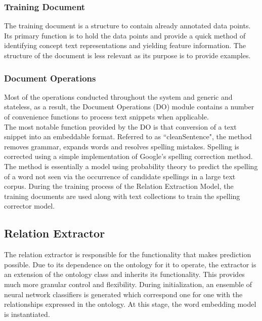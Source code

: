 \documentclass[12pt]{article} %
\begin{document}
\subsubsection{Training Document}

The training document is a structure to contain already annotated data points. Its primary function is to hold the data points and provide a quick method of identifying concept text representations and yielding feature information. The structure of the document is less relevant as its purpose is to provide examples. 

\subsubsection{Document Operations}

Most of the operations conducted throughout the system and generic and stateless, as a result, the Document Operations (DO) module contains a number of convenience functions to process text snippets when applicable.\\

The most notable function provided by the DO is that conversion of a text snippet into an embeddable format. Referred to as ``cleanSentence", the method removes grammar, expands words and resolves spelling mistakes. Spelling is corrected using a simple implementation of Google’s spelling correction method. The method is essentially a model using probability theory to predict the spelling of a word not seen via the occurrence of candidate spellings in a large text corpus. During the training process of the Relation Extraction Model, the training documents are used along with text collections to train the spelling corrector model.

\subsection{Relation Extractor} \label{extractor}

The relation extractor is responsible for the functionality that makes prediction possible. Due to its dependence on the ontology for it to operate, the extractor is an extension of the ontology class and inherits its functionality. This provides much more granular control and flexibility. During initialization, an ensemble of neural network classifiers is generated which correspond one for one with the relationships expressed in the ontology. At this stage, the word embedding model is instantiated.\\
\end{document}
